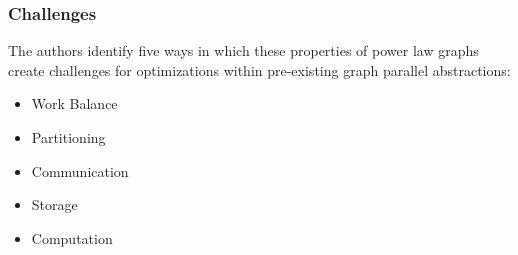 \begin{frame}
  \frametitle{Challenges}
  The authors identify five ways in which these properties of power law graphs
  create challenges for optimizations within pre-existing graph parallel
  abstractions:
  \begin{itemize}
    \item Work Balance
    \item Partitioning
    \item Communication
    \item Storage
    \item Computation
  \end{itemize}
\end{frame}
